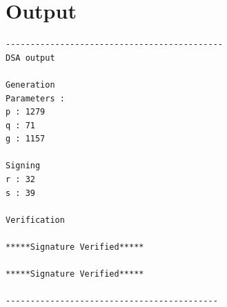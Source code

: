 \documentclass[a4paper,12pt]{article}
\begin{document}
\section{Output}
\begin{verbatim}
--------------------------------------------
DSA output

Generation
Parameters : 
p : 1279
q : 71
g : 1157

Signing
r : 32
s : 39

Verification

*****Signature Verified*****

*****Signature Verified*****

-------------------------------------------
\end{verbatim}
\end{document}
